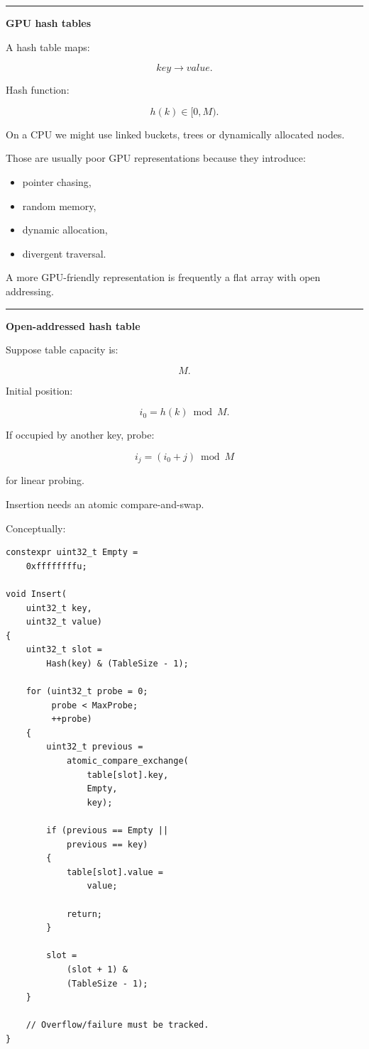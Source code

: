 \begin{center}\rule{0.5\linewidth}{0.5pt}\end{center}

\textbf{GPU hash tables}

A hash table maps:

\[
key\rightarrow value.
\]

Hash function:

\[
h(k)\in[0,M).
\]

On a CPU we might use linked buckets, trees or dynamically allocated nodes.

Those are usually poor GPU representations because they introduce:

\begin{itemize}
\tightlist
\item
  pointer chasing,
\item
  random memory,
\item
  dynamic allocation,
\item
  divergent traversal.
\end{itemize}

A more GPU-friendly representation is frequently a flat array with open addressing.

\begin{center}\rule{0.5\linewidth}{0.5pt}\end{center}

\textbf{Open-addressed hash table}

Suppose table capacity is:

\[
M.
\]

Initial position:

\[
i_0=h(k)\bmod M.
\]

If occupied by another key, probe:

\[
i_j=
(i_0+j)\bmod M
\]

for linear probing.

Insertion needs an atomic compare-and-swap.

Conceptually:

\protect{}\label{p10-hash-insert}%
\begin{verbatim}
constexpr uint32_t Empty =
    0xffffffffu;

void Insert(
    uint32_t key,
    uint32_t value)
{
    uint32_t slot =
        Hash(key) & (TableSize - 1);

    for (uint32_t probe = 0;
         probe < MaxProbe;
         ++probe)
    {
        uint32_t previous =
            atomic_compare_exchange(
                table[slot].key,
                Empty,
                key);

        if (previous == Empty ||
            previous == key)
        {
            table[slot].value =
                value;

            return;
        }

        slot =
            (slot + 1) &
            (TableSize - 1);
    }

    // Overflow/failure must be tracked.
}
\end{verbatim}

